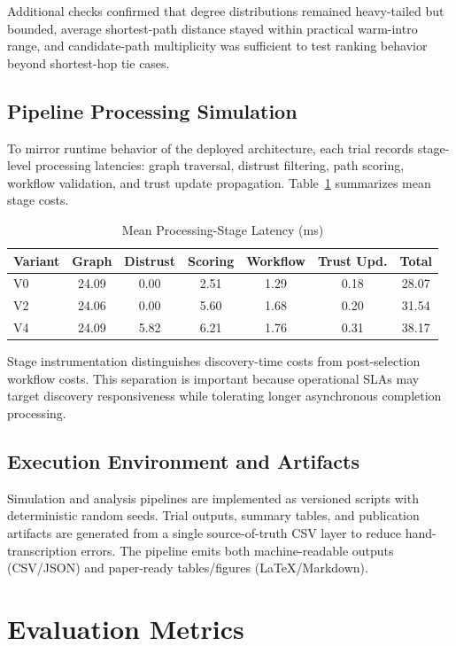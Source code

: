 \documentclass[conference]{IEEEtran}
\begin{document}
Additional checks confirmed that degree distributions remained heavy-tailed but bounded, average shortest-path distance stayed within practical warm-intro range, and candidate-path multiplicity was sufficient to test ranking behavior beyond shortest-hop tie cases.

\subsection{Pipeline Processing Simulation}
To mirror runtime behavior of the deployed architecture, each trial records stage-level processing latencies: graph traversal, distrust filtering, path scoring, workflow validation, and trust update propagation. Table~\ref{tab:pipeline_latency} summarizes mean stage costs.

\begin{table}[htbp]
\caption{Mean Processing-Stage Latency (ms)}
\label{tab:pipeline_latency}
\centering
\begin{tabular}{lcccccc}
\toprule
Variant & Graph & Distrust & Scoring & Workflow & Trust Upd. & Total \\
\midrule
V0 & 24.09 & 0.00 & 2.51 & 1.29 & 0.18 & 28.07 \\
V2 & 24.06 & 0.00 & 5.60 & 1.68 & 0.20 & 31.54 \\
V4 & 24.09 & 5.82 & 6.21 & 1.76 & 0.31 & 38.17 \\
\bottomrule
\end{tabular}
\end{table}

Stage instrumentation distinguishes discovery-time costs from post-selection workflow costs. This separation is important because operational SLAs may target discovery responsiveness while tolerating longer asynchronous completion processing.

\subsection{Execution Environment and Artifacts}
Simulation and analysis pipelines are implemented as versioned scripts with deterministic random seeds. Trial outputs, summary tables, and publication artifacts are generated from a single source-of-truth CSV layer to reduce hand-transcription errors. The pipeline emits both machine-readable outputs (CSV/JSON) and paper-ready tables/figures (LaTeX/Markdown).

\section{Evaluation Metrics}
\end{document}
